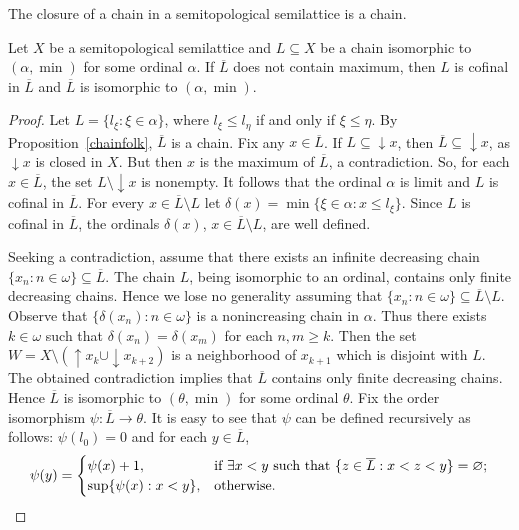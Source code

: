 \documentclass[10pt,a4paper]{amsart}
\newcommand{\w}{\omega}
\begin{document}
\begin{proposition}[Folklore]\label{chainfolk}
The closure of a chain in a semitopological semilattice is a chain.    
\end{proposition}

\begin{lemma}\label{+1}
Let $X$ be a semitopological semilattice and $L\subseteq X$ be a chain isomorphic to $(\alpha,\min)$ for some ordinal $\alpha$. If $\overline{L}$ does not contain maximum, then $L$ is cofinal in $\overline{L}$ and $\overline{L}$ is isomorphic to $(\alpha,\min)$.    
\end{lemma}  

\begin{proof}
Let $L=\{l_\xi:\xi\in\alpha\}$, where $l_\xi\leq l_{\eta}$ if and only if $\xi\leq \eta$. By Proposition~\ref{chainfolk}, $\overline{L}$ is a chain.  Fix any $x\in\overline{L}$. If $L\subseteq {\downarrow}x$, then $\overline{L}\subseteq {\downarrow}x$, as ${\downarrow}x$ is closed in $X$. But then $x$ is the maximum of $\overline{L}$, a contradiction. So, for each $x\in\overline{L}$, the set $L\setminus {\downarrow}x$ is nonempty. It follows that the ordinal $\alpha$ is limit and $L$ is cofinal in $\overline{L}$.
For every $x\in \overline{L}\setminus L$ let $\delta(x)=\min\{\xi\in\alpha: x\leq l_\xi\}$. Since $L$ is cofinal in $\overline{L}$, the ordinals $\delta(x)$, $x\in \overline{L}\setminus L$, are well defined. 

Seeking a contradiction, assume that there exists an infinite decreasing chain $\{x_n:n\in\w\}\subseteq \overline{L}$. The chain $L$, being isomorphic to an ordinal, contains only finite decreasing chains. Hence we lose no generality assuming that $\{x_n:n\in\w\}\subseteq \overline{L}\setminus L$. Observe that $\{\delta(x_n):n\in\w\}$ is a nonincreasing chain in $\alpha$. Thus there exists $k\in\w$ such that $\delta(x_n)=\delta(x_m)$ for each $n,m\geq k$. Then the set $W=X\setminus ({\uparrow}x_k\cup {\downarrow}x_{k+2})$ is a neighborhood of $x_{k+1}$ which is disjoint with $L$. The obtained contradiction implies that $\overline{L}$ contains only finite decreasing chains. Hence $\overline{L}$ is isomorphic to $(\theta,\min)$ for some ordinal $\theta$. Fix the order isomorphism $\psi:\overline{L}\rightarrow \theta$. It is easy to see that $\psi$ can be defined  recursively as follows: $\psi(l_0)=0$ and for each $y\in\overline{L}$,
$$\psi(y)=
\begin{cases}
 \psi(x)+1, & \hbox{if }\exists x<y \hbox{ such that } \{z\in \overline L: x<z<y\}=\varnothing;\\
 \sup\{\psi(x):x< y\}, & \hbox{otherwise}.
\end{cases}
$$


\end{proof}
\end{document}
